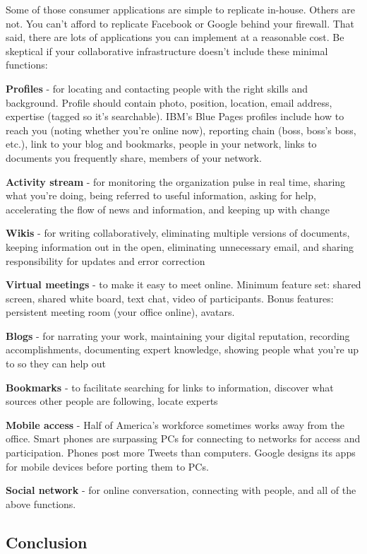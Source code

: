 Some of those consumer applications are simple to replicate in-house.
Others are not. You can't afford to replicate Facebook or Google behind
your firewall. That said, there are lots of applications you can
implement at a reasonable cost. Be skeptical if your collaborative
infrastructure doesn't include these minimal functions:

\textbf{Profiles} - for locating and contacting people with the right
skills and background. Profile should contain photo, position, location,
email address, expertise (tagged so it's searchable). IBM's Blue Pages
profiles include how to reach you (noting whether you're online now),
reporting chain (boss, boss's boss, etc.), link to your blog and
bookmarks, people in your network, links to documents you frequently
share, members of your network.

\textbf{Activity stream} - for monitoring the organization pulse in real
time, sharing what you're doing, being referred to useful information,
asking for help, accelerating the flow of news and information, and
keeping up with change

\textbf{Wikis} - for writing collaboratively, eliminating multiple
versions of documents, keeping information out in the open, eliminating
unnecessary email, and sharing responsibility for updates and error
correction

\textbf{Virtual meetings} - to make it easy to meet online. Minimum
feature set: shared screen, shared white board, text chat, video of
participants. Bonus features: persistent meeting room (your office
online), avatars.

\textbf{Blogs} - for narrating your work, maintaining your digital
reputation, recording accomplishments, documenting expert knowledge,
showing people what you're up to so they can help out

\textbf{Bookmarks} - to facilitate searching for links to information,
discover what sources other people are following, locate experts

\textbf{Mobile access} - Half of America's workforce sometimes works
away from the office. Smart phones are surpassing PCs for connecting to
networks for access and participation. Phones post more Tweets than
computers. Google designs its apps for mobile devices before porting
them to PCs.

\textbf{Social network} - for online conversation, connecting with
people, and all of the above functions.

\hypertarget{conclusion}{%
\subsection{Conclusion}\label{conclusion}}

